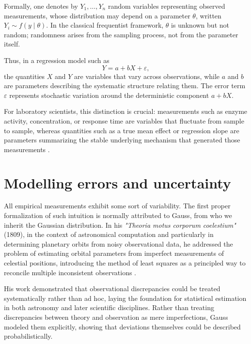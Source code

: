 \medskip

Formally, one denotes by \(Y_1,\dots,Y_n\) random variables representing observed measurements, whose distribution may depend on a parameter \(\theta\), written \(Y_i \sim f(y \mid \theta)\). In the classical frequentist framework, \(\theta\) is unknown but not random; randomness arises from the sampling process, not from the parameter itself.

\medskip

Thus, in a regression model such as 
\[
Y = a + bX + \varepsilon,
\]
the quantities \(X\) and \(Y\) are variables that vary across observations, while \(a\) and \(b\) are parameters describing the systematic structure relating them. The error term \(\varepsilon\) represents stochastic variation around the deterministic component \(a + bX\).

\medskip

For laboratory scientists, this distinction is crucial: measurements such as enzyme activity, concentration, or response time are variables that fluctuate from sample to sample, whereas quantities such as a true mean effect or regression slope are parameters summarizing the stable underlying mechanism that generated those measurements \cite{degroot_2012_probability}. 

\section{Modelling errors and uncertainty}

All empirical measurements exhibit some sort of variability. The first proper formalization of such intuition is normally attributed to Gauss, from who we inherit the Gaussian distribution. In his \textit{"Theoria motus corporum coelestium"} (1809), in the context of astronomical computation and particularly in determining planetary orbits from noisy observational data, he addressed the problem of estimating orbital parameters from imperfect measurements of celestial positions, introducing the method of least squares as a principled way to reconcile multiple inconsistent observations \cite{gauss_1809_theoria}. 

\medskip

His work demonstrated that observational discrepancies could be treated systematically rather than ad hoc, laying the foundation for statistical estimation in both astronomy and later scientific disciplines. Rather than treating discrepancies between theory and observation as mere imperfections, Gauss modeled them explicitly, showing that deviations themselves could be described probabilistically.

